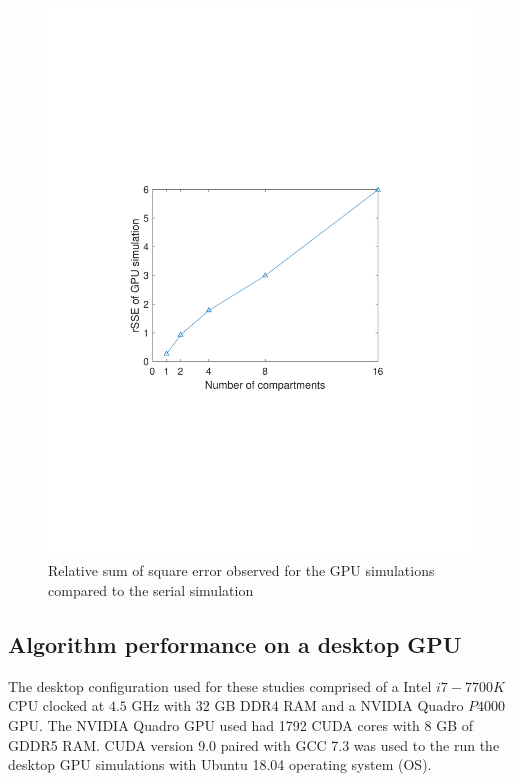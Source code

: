\documentclass[preprint,10pt,authoryear,review]{elsarticle}
\begin{document}
\begin{figure}[h]
\centering
\includegraphics[scale=0.7]{gpu_error.pdf}
\caption{Relative sum of square error observed for the GPU simulations compared to 
the serial simulation}
\label{fig:res_gpu_timings}
\end{figure}


\subsection{Algorithm performance on a desktop GPU}
The desktop configuration used for these studies comprised of a Intel $i7-7700K$  
CPU clocked at $4.5$ GHz with $32$ GB DDR4 RAM and a NVIDIA Quadro $P4000$ GPU. 
The NVIDIA Quadro GPU used had 1792 CUDA cores with 8 GB of GDDR5 RAM. 
CUDA version 9.0 paired with GCC 7.3 was used to the run the desktop GPU simulations 
with Ubuntu 18.04 operating system (OS).
\end{document}
